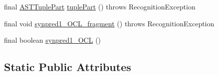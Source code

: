 \begin{DoxyCompactItemize}
\item 
final \hyperlink{classorg_1_1tzi_1_1use_1_1parser_1_1ocl_1_1_a_s_t_tuple_part}{A\-S\-T\-Tuple\-Part} \hyperlink{classorg_1_1tzi_1_1use_1_1parser_1_1ocl_1_1_o_c_l_parser_abd0fca834618f76052ee7d7c4ac00854}{tuple\-Part} ()  throws Recognition\-Exception 
\item 
final void \hyperlink{classorg_1_1tzi_1_1use_1_1parser_1_1ocl_1_1_o_c_l_parser_a0fd0064297f95466fee06522cdb55979}{synpred1\-\_\-\-O\-C\-L\-\_\-fragment} ()  throws Recognition\-Exception 
\item 
final boolean \hyperlink{classorg_1_1tzi_1_1use_1_1parser_1_1ocl_1_1_o_c_l_parser_a934028bea0f15a669c2f72bb221a7828}{synpred1\-\_\-\-O\-C\-L} ()
\end{DoxyCompactItemize}
\subsection*{Static Public Attributes}
